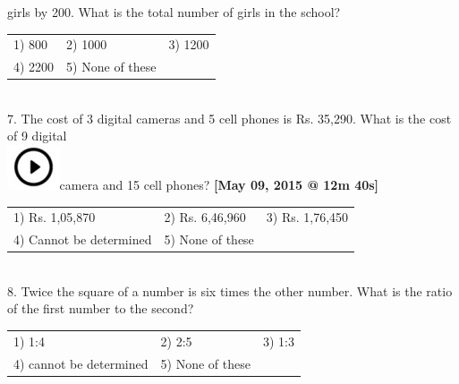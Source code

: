 \documentclass{article}
\begin{document}
	\noindent 
	
	\noindent girls by 200. What is the total number of girls in the school?
	
	\noindent 
	
	\noindent \begin{tabular}{p{1.7in} p{1.6in} p{1.6in}} \\ 
 1) 800                      &  2) 1000             &  3) 1200             \\
4) 2200             & 5) None of these  \\
\end{tabular}
	
	\noindent  \\  
	
	7.   The cost of 3 digital cameras and 5 cell phones is Rs. 35,290. What is the cost of 9 digital  
	\noindent \\ \includegraphics*[width=0.61in, height=0.52in]{images/image1}camera and 15 cell phones?          \textbf{[May 09, 2015 @ 12m 40s]}
	
	\noindent \begin{tabular}{p{1.7in} p{1.6in} p{1.6in}} \\ 
 1) Rs. 1,05,870                                                  &  2) Rs. 6,46,960                              &  3) Rs. 1,76,450
	
	\noindent 
	
	\noindent \\
4) Cannot be determined                           & 5) None of these  \\
\end{tabular}
	
	\noindent 
	
	\noindent 
	
	\noindent 
	
	\noindent \\   8.   Twice the square of a number is six times the other number. What is the ratio of the first number to the second? 
	
		\begin{tabular}{p{1.7in} p{1.6in} p{1.6in}} \\ 
 1) 1:4 &  2) 2:5 &  3) 1:3  \\
4) cannot be determined   & 5) None of these  \\
\end{tabular} 
	
\end{document}
